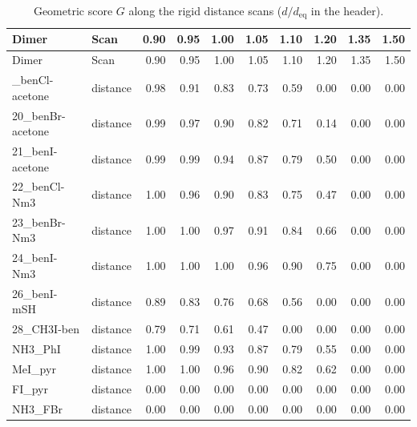 {\scriptsize
\setlength{\tabcolsep}{3pt}
\begin{longtable}{llrrrrrrrr}
\caption{Geometric score $G$ along the rigid distance scans ($d/d_\mathrm{eq}$ in the header).}\label{tab:scand}\\
\toprule
Dimer & Scan & 0.90 & 0.95 & 1.00 & 1.05 & 1.10 & 1.20 & 1.35 & 1.50\\
\midrule
\endfirsthead
\toprule
Dimer & Scan & 0.90 & 0.95 & 1.00 & 1.05 & 1.10 & 1.20 & 1.35 & 1.50\\
\midrule
\endhead
\bottomrule
\endlastfoot
19\_benCl-acetone & distance & 0.98 & 0.91 & 0.83 & 0.73 & 0.59 & 0.00 & 0.00 & 0.00\\
20\_benBr-acetone & distance & 0.99 & 0.97 & 0.90 & 0.82 & 0.71 & 0.14 & 0.00 & 0.00\\
21\_benI-acetone & distance & 0.99 & 0.99 & 0.94 & 0.87 & 0.79 & 0.50 & 0.00 & 0.00\\
22\_benCl-Nm3 & distance & 1.00 & 0.96 & 0.90 & 0.83 & 0.75 & 0.47 & 0.00 & 0.00\\
23\_benBr-Nm3 & distance & 1.00 & 1.00 & 0.97 & 0.91 & 0.84 & 0.66 & 0.00 & 0.00\\
24\_benI-Nm3 & distance & 1.00 & 1.00 & 1.00 & 0.96 & 0.90 & 0.75 & 0.00 & 0.00\\
26\_benI-mSH & distance & 0.89 & 0.83 & 0.76 & 0.68 & 0.56 & 0.00 & 0.00 & 0.00\\
28\_CH3I-ben & distance & 0.79 & 0.71 & 0.61 & 0.47 & 0.00 & 0.00 & 0.00 & 0.00\\
NH3\_PhI & distance & 1.00 & 0.99 & 0.93 & 0.87 & 0.79 & 0.55 & 0.00 & 0.00\\
MeI\_pyr & distance & 1.00 & 1.00 & 0.96 & 0.90 & 0.82 & 0.62 & 0.00 & 0.00\\
FI\_pyr & distance & 0.00 & 0.00 & 0.00 & 0.00 & 0.00 & 0.00 & 0.00 & 0.00\\
NH3\_FBr & distance & 0.00 & 0.00 & 0.00 & 0.00 & 0.00 & 0.00 & 0.00 & 0.00\\
\end{longtable}}
